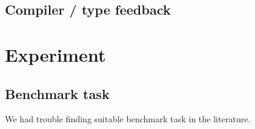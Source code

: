 \documentclass{article}
\begin{document}
\subsection{Compiler / type feedback}


\section{Experiment} %

\subsection{Benchmark task}


We had trouble finding suitable benchmark task in the literature.
\end{document}
